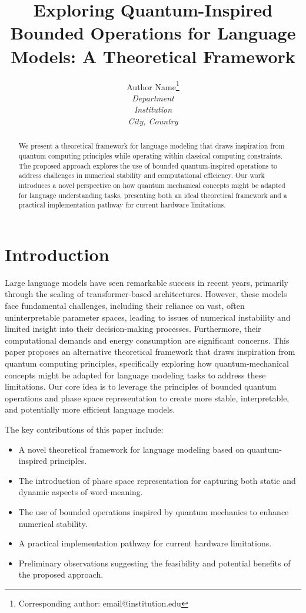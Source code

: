 \documentclass[twocolumn]{article}
\title{Exploring Quantum-Inspired Bounded Operations for Language Models: A Theoretical Framework}
\author{
    Author Name\thanks{Corresponding author: email@institution.edu}\\
    \textit{Department}\\
    \textit{Institution}\\
    \textit{City, Country}
}
\begin{document}
\maketitle

\begin{abstract}
We present a theoretical framework for language modeling that draws inspiration from quantum computing principles while operating within classical computing constraints. The proposed approach explores the use of bounded quantum-inspired operations to address challenges in numerical stability and computational efficiency. Our work introduces a novel perspective on how quantum mechanical concepts might be adapted for language understanding tasks, presenting both an ideal theoretical framework and a practical implementation pathway for current hardware limitations.
\end{abstract}

\section{Introduction}
Large language models have seen remarkable success in recent years, primarily through the scaling of transformer-based architectures. However, these models face fundamental challenges, including their reliance on vast, often uninterpretable parameter spaces, leading to issues of numerical instability and limited insight into their decision-making processes. Furthermore, their computational demands and energy consumption are significant concerns. This paper proposes an alternative theoretical framework that draws inspiration from quantum computing principles, specifically exploring how quantum-mechanical concepts might be adapted for language modeling tasks to address these limitations. Our core idea is to leverage the principles of bounded quantum operations and phase space representation to create more stable, interpretable, and potentially more efficient language models.

The key contributions of this paper include:
\begin{itemize}
    \item A novel theoretical framework for language modeling based on quantum-inspired principles.
    \item The introduction of phase space representation for capturing both static and dynamic aspects of word meaning.
    \item The use of bounded operations inspired by quantum mechanics to enhance numerical stability.
    \item A practical implementation pathway for current hardware limitations.
    \item Preliminary observations suggesting the feasibility and potential benefits of the proposed approach.
\end{itemize}
\end{document}
